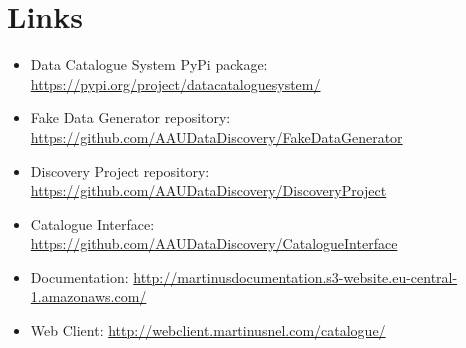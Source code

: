 \chapter{Links}\label{ch:links}

\begin{itemize}
    \item Data Catalogue System PyPi package: \url{https://pypi.org/project/datacataloguesystem/}
    \item Fake Data Generator repository: \url{https://github.com/AAUDataDiscovery/FakeDataGenerator}
    \item Discovery Project repository: \url{https://github.com/AAUDataDiscovery/DiscoveryProject}
    \item Catalogue Interface: \url{https://github.com/AAUDataDiscovery/CatalogueInterface}
    \item Documentation: \url{http://martinusdocumentation.s3-website.eu-central-1.amazonaws.com/}
    \item Web Client: \url{http://webclient.martinusnel.com/catalogue/}
\end{itemize}

